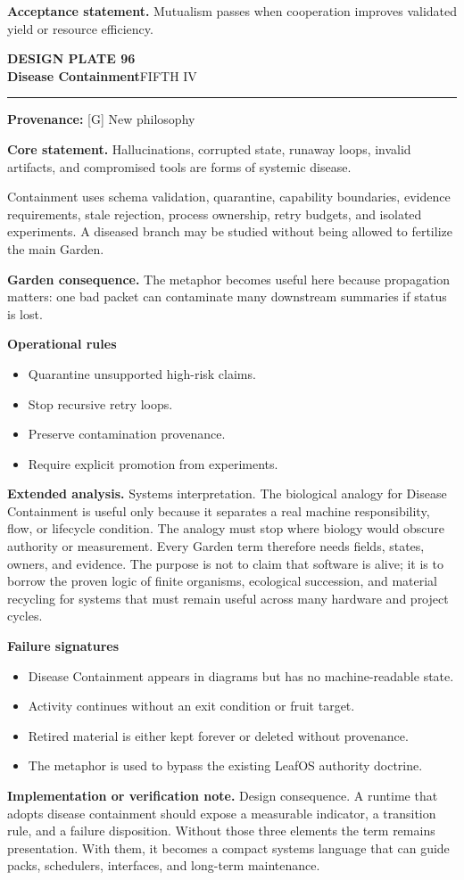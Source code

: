 \documentclass[10pt,letterpaper,oneside]{article}
\newcommand{\prov}[1]{\textcolor{gardenBlue}{\sffamily\footnotesize\textbf{Provenance:} #1}}
\newcommand{\platetitle}[3]{%
  \begin{minipage}[t][0.54in][t]{\textwidth}
  {\sffamily\bfseries\color{gardenDeep}\fontsize{9}{10}\selectfont DESIGN PLATE #1}\\[-1pt]
  {\sffamily\bfseries\color{gardenInk}\fontsize{16.5}{18}\selectfont #2}\hfill{\sffamily\color{gardenGreen}\large #3}
  \end{minipage}\vspace{-2pt}\hrule\vspace{5pt}}
\begin{document}
\begin{acceptbox}
\textbf{Acceptance statement.} Mutualism passes when cooperation improves validated yield or resource efficiency.
\end{acceptbox}
\newpage
\platetitle{96}{Disease Containment}{FIFTH IV}
\prov{[G] New philosophy}
\fontsize{8.85}{10.45}\selectfont
\begin{corebox}
\textbf{Core statement.} Hallucinations, corrupted state, runaway loops, invalid artifacts, and compromised tools are forms of systemic disease.
\end{corebox}
Containment uses schema validation, quarantine, capability boundaries, evidence requirements, stale rejection, process ownership, retry budgets, and isolated experiments. A diseased branch may be studied without being allowed to fertilize the main Garden.

\textbf{Garden consequence.} The metaphor becomes useful here because propagation matters: one bad packet can contaminate many downstream summaries if status is lost.

\textbf{Operational rules}
\begin{itemize}
\item Quarantine unsupported high-risk claims.
\item Stop recursive retry loops.
\item Preserve contamination provenance.
\item Require explicit promotion from experiments.
\end{itemize}
\textbf{Extended analysis.} Systems interpretation. The biological analogy for Disease Containment is useful only because it separates a real machine responsibility, flow, or lifecycle condition. The analogy must stop where biology would obscure authority or measurement. Every Garden term therefore needs fields, states, owners, and evidence. The purpose is not to claim that software is alive; it is to borrow the proven logic of finite organisms, ecological succession, and material recycling for systems that must remain useful across many hardware and project cycles.

\textbf{Failure signatures}
\begin{itemize}
\item Disease Containment appears in diagrams but has no machine-readable state.
\item Activity continues without an exit condition or fruit target.
\item Retired material is either kept forever or deleted without provenance.
\item The metaphor is used to bypass the existing LeafOS authority doctrine.
\end{itemize}
\textbf{Implementation or verification note.} Design consequence. A runtime that adopts disease containment should expose a measurable indicator, a transition rule, and a failure disposition. Without those three elements the term remains presentation. With them, it becomes a compact systems language that can guide packs, schedulers, interfaces, and long-term maintenance.
\end{document}
